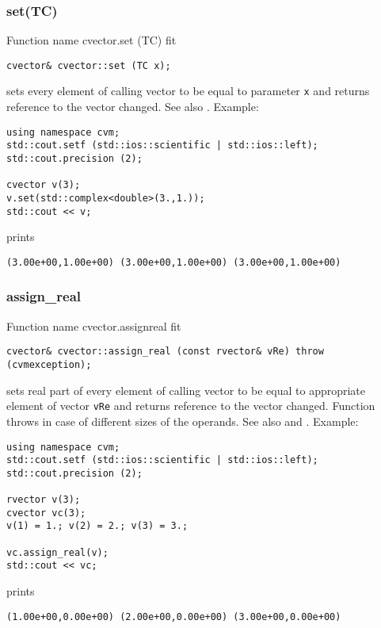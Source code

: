 \subsubsection{set(TC)}
Function%
\pdfdest name {cvector.set (TC)} fit
\begin{verbatim}
cvector& cvector::set (TC x);
\end{verbatim}
sets every element of  calling vector to be equal to
parameter \verb"x"
and returns  reference to the vector changed.
See also .
Example:
\begin{Verbatim}
using namespace cvm;
std::cout.setf (std::ios::scientific | std::ios::left);
std::cout.precision (2);

cvector v(3);
v.set(std::complex<double>(3.,1.));
std::cout << v;
\end{Verbatim}
prints
\begin{Verbatim}
(3.00e+00,1.00e+00) (3.00e+00,1.00e+00) (3.00e+00,1.00e+00)
\end{Verbatim}
\newpage



\subsubsection{assign\_real}
Function%
\pdfdest name {cvector.assignreal} fit
\begin{verbatim}
cvector& cvector::assign_real (const rvector& vRe) throw (cvmexception);
\end{verbatim}
sets real part of every element of  calling vector to be equal to
appropriate element of  vector \verb"vRe"
and returns  reference to
the vector changed.
Function throws  
in case of different sizes of the operands.
See also  and .
Example:
\begin{Verbatim}
using namespace cvm;
std::cout.setf (std::ios::scientific | std::ios::left);
std::cout.precision (2);

rvector v(3);
cvector vc(3);
v(1) = 1.; v(2) = 2.; v(3) = 3.;

vc.assign_real(v);
std::cout << vc;
\end{Verbatim}
prints
\begin{Verbatim}
(1.00e+00,0.00e+00) (2.00e+00,0.00e+00) (3.00e+00,0.00e+00)
\end{Verbatim}
\newpage


